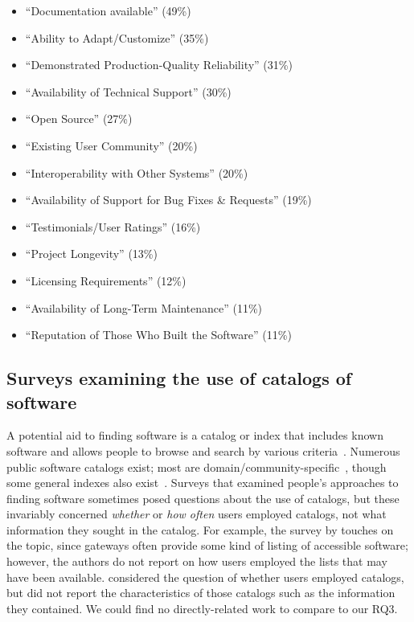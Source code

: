 \documentclass[review]{elsarticle}
\begin{document}
\begin{itemize}
\begin{itemize}[itemsep=0ex]
\item ``Documentation available'' (49\%)
\item ``Ability to Adapt/Customize'' (35\%)
\item ``Demonstrated Production-Quality Reliability'' (31\%)
\item ``Availability of Technical Support'' (30\%)
\item ``Open Source'' (27\%)
\item ``Existing User Community'' (20\%)
\item ``Interoperability with Other Systems'' (20\%)
\item ``Availability of Support for Bug Fixes \& Requests'' (19\%)
\item ``Testimonials/User Ratings'' (16\%)
\item ``Project Longevity'' (13\%)
\item ``Licensing Requirements'' (12\%)
\item ``Availability of Long-Term Maintenance'' (11\%)
\item ``Reputation of Those Who Built the Software'' (11\%)
\end{itemize}

\end{itemize}


\subsection{Surveys examining the use of catalogs of software}
\label{surveys-catalogs}

A potential aid to finding software is a catalog or index that includes known software and allows people to browse and search by various criteria~\citep{marshall2006software, allen2015looking, mena2006software, katz2015catalogs, white2014nih}.  Numerous public software catalogs exist; most are domain/community-specific~\cite[e.g.,][]{nasa2016software, hempel2016xsede, darpa2015open, allen_2012, noy2009bioportal, hucka2016software, gleeson2016current, browne1995netlib, bonisch_2013}, though some general indexes also exist~\cite[e.g.,][]{blackduck2016open, freshcode2016, johansson2016alternative, sourceforge2016}.  Surveys that examined people's approaches to finding software sometimes posed questions about the use of catalogs, but these invariably concerned \emph{whether} or \emph{how often} users employed catalogs, not what information they sought in the catalog.  For example, the survey by \citet{lawrence2015science} touches on the topic, since gateways often provide some kind of listing of accessible software; however, the authors do not report on how users employed the lists that may have been available.  \citet{marshall2006software} considered the question of whether users employed catalogs, but did not report the characteristics of those catalogs such as the information they contained.  We could find no directly-related work to compare to our RQ3.
\end{document}
